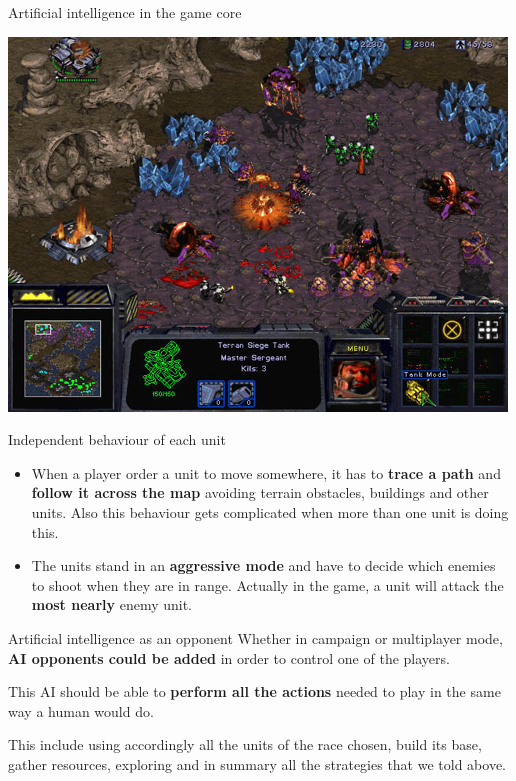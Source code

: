 \documentclass[10pt]{beamer}
\begin{document}
\begin{frame}{Artificial intelligence in the game core}
\begin{center}
	  \includegraphics[scale=0.6]{iso.png}
\end{center}
\end{frame}


\begin{frame}{Independent behaviour of each unit}
      \begin{itemize}
       \item When a player order a unit to move somewhere, it has to \textbf{trace a path} and \textbf{follow it across the map} avoiding terrain obstacles, buildings and other units. Also this behaviour gets complicated when more than one unit is doing this.\newline
       \item The units stand in an \textbf{aggressive mode} and have to decide which enemies to shoot when they are in range. Actually in the game, a unit will attack the \textbf{most nearly} enemy unit.
      \end{itemize}
\end{frame}


\begin{frame}{Artificial intelligence as an opponent}
      Whether in campaign or multiplayer mode, \textbf{AI opponents could be added} in order to control one of the players. \newline

      This AI should be able to \textbf{perform all the actions} needed to play in the same way a human would do. \newline

      This include using accordingly all the units of the race chosen, build its base, gather resources, exploring and in summary all the strategies that we told above.
\end{frame}
\end{document}
